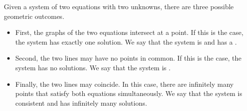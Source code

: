 \documentclass{ximera}
\begin{document}
Given a system of two equations with two unknowns, there are three possible geometric outcomes.  
\begin{itemize}
\item First, the graphs of the two equations intersect at a point.  If this is the case, the system has exactly one solution. We say that the system is  and has a .  

\begin{center}
\end{center}
\item Second, the two lines may have no points in common.  If this is the case, the system has no solutions.  We say that the system is .  
\begin{center}
\end{center}
\item Finally, the two lines may coincide.  In this case, there are infinitely many points that satisfy both equations simultaneously.  We say that the system is consistent and has infinitely many solutions.
\begin{center}
\end{center}
\end{itemize}
\end{document}
